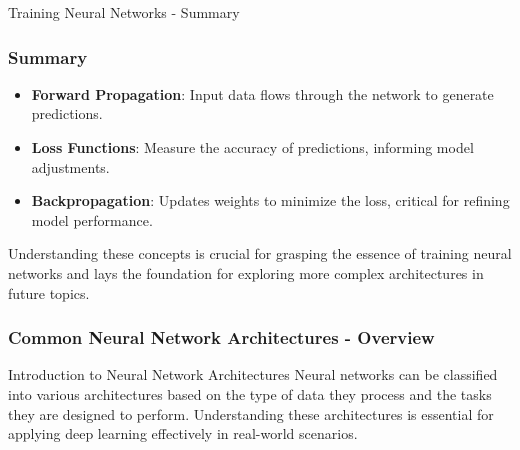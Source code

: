 \documentclass[aspectratio=169]{beamer}
\begin{document}
\begin{frame}[fragile]{Training Neural Networks - Summary}
    \frametitle{Summary}
    \begin{itemize}
        \item \textbf{Forward Propagation}: Input data flows through the network to generate predictions.
        \item \textbf{Loss Functions}: Measure the accuracy of predictions, informing model adjustments.
        \item \textbf{Backpropagation}: Updates weights to minimize the loss, critical for refining model performance.
    \end{itemize}

    Understanding these concepts is crucial for grasping the essence of training neural networks and lays the foundation for exploring more complex architectures in future topics.
\end{frame}

\begin{frame}[fragile]
    \frametitle{Common Neural Network Architectures - Overview}
    \begin{block}{Introduction to Neural Network Architectures}
        Neural networks can be classified into various architectures based on the type of data they process and the tasks they are designed to perform. Understanding these architectures is essential for applying deep learning effectively in real-world scenarios.
    \end{block}
\end{frame}
\end{document}
